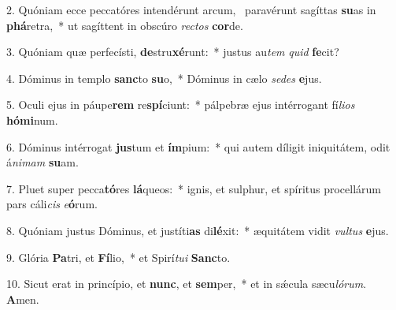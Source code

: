 2. Quóniam ecce peccatóres intendérunt arcum, \dag\  paravérunt sagíttas \textbf{su}as in \textbf{phá}retra,~*  ut sagíttent in obscúro \textit{rec}\textit{tos} \textbf{cor}de.\

3. Quóniam quæ perfecísti, \textbf{de}stru\textbf{xé}runt:~*  justus au\textit{tem} \textit{quid} \textbf{fe}cit?\

4. Dóminus in templo \textbf{sanc}to \textbf{su}o,~*  Dóminus in cælo \textit{se}\textit{des} \textbf{e}jus.\

5. Oculi ejus in páupe\textbf{rem} re\textbf{spí}ciunt:~*  pálpebræ ejus intérrogant fí\textit{li}\textit{os} \textbf{hó}\textbf{mi}num.\

6. Dóminus intérrogat \textbf{jus}tum et \textbf{ím}pium:~*  qui autem díligit iniquitátem, odit á\textit{ni}\textit{mam} \textbf{su}am.\

7. Pluet super pecca\textbf{tó}res \textbf{lá}queos:~*  ignis, et sulphur, et spíritus procellárum pars cáli\textit{cis} \textit{e}\textbf{ó}rum.\

8. Quóniam justus Dóminus, et justíti\textbf{as} di\textbf{lé}xit:~*  æquitátem vidit \textit{vul}\textit{tus} \textbf{e}jus.\

9. Glória \textbf{Pa}tri, et \textbf{Fí}lio,~*  et Spirí\textit{tu}\textit{i} \textbf{Sanc}to.\

10. Sicut erat in princípio, et \textbf{nunc}, et \textbf{sem}per,~*  et in sǽcula sæcu\textit{ló}\textit{rum}. \textbf{A}men.\

